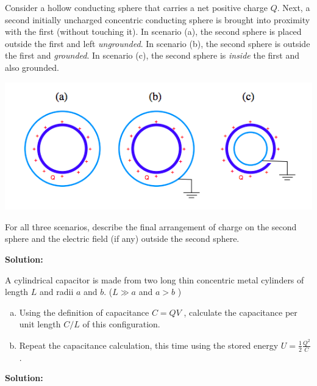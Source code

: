 \documentclass[11pt]{article}
\newcommand{\be}{\begin{enumerate}[a) ]}
\newcommand{\ee}{\end{enumerate}}
\begin{document}
\begin{problem}[5.]
Consider a hollow conducting sphere that carries a net positive charge $Q$. Next, a second
initially uncharged concentric conducting sphere is brought into proximity with the first
(without touching it). In scenario (a), the second sphere is placed outside the first and left
\textit{ungrounded}. In scenario (b), the second sphere is outside the first and \textit{grounded}. In
scenario (c), the second sphere is \textit{inside} the first and also grounded.
\begin{center}
\includegraphics[scale=0.5]{prob5.png}
\end{center}
For all three scenarios, describe the final arrangement of charge on the second sphere and
the electric field (if any) outside the second sphere.
\end{problem}


\textbf{Solution:}


\clearpage

\begin{problem}[6.]
A cylindrical capacitor is made from two long thin concentric metal cylinders of length $L$
and radii $a$ and $b$. ($L \gg a$ and $a >b$ )
\be
\item Using the definition of capacitance $C =Q V$ ,	calculate the capacitance per unit
length $C /L$ of this configuration.
\item Repeat the capacitance calculation, this time using the stored energy $U = \frac{1}{2}\frac{Q^2}{C}$.
\ee
\end{problem}


\textbf{Solution:}


\clearpage
\end{document}
